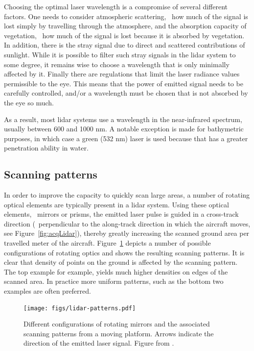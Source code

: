Choosing the optimal laser wavelength is a compromise of several different factors. 
One needs to consider atmospheric scattering, 
\ie\ how much of the signal is lost simply by travelling through the atmosphere, and the absorption capacity of vegetation, \ie\ how much of  the signal is lost because it is absorbed by vegetation. In addition, there is the stray signal due to direct and scattered contributions of sunlight. While it is possible to filter such stray signals in the lidar system to some degree, it remains wise to choose a wavelength that is only minimally affected by it. Finally there are regulations that limit the laser radiance values permissible to the eye. This means that the power of emitted signal needs to be carefully controlled, and/or a wavelength must be chosen that  is not absorbed by the eye so much.

As a result, most lidar systems use a wavelength in the near-infrared spectrum, usually between 600 and 1000 nm. A notable exception is made for bathymetric purposes, in which case a green (532 nm) laser is used because that has a greater penetration ability in water.

\subsection{Scanning patterns}
In order to improve the capacity to quickly scan large areas, a number of rotating optical elements are typically present in a lidar system. Using these optical elements, \ie\  mirrors or prisms, the emitted laser pulse is guided in a cross-track direction (\ie\ perpendicular to the along-track direction in which  the aircraft moves, see Figure~\ref{fig:acqLidar}),  thereby greatly increasing the scanned ground area  per travelled meter of the aircraft.
Figure~\ref{fig:lidar-patterns} depicts a number of possible configurations of rotating optics and shows the resulting scanning patterns. It is clear that density of points on the ground is affected by the scanning pattern. The top example for example, yields much higher densities on edges of the scanned area. In practice more uniform patterns, such  as the bottom two examples are often preferred.

\begin{figure}
	\centering
	\texttt{[image: figs/lidar-patterns.pdf]}
	\caption{Different configurations of rotating mirrors and the associated scanning patterns from a moving platform. Arrows indicate the direction of the emitted laser signal. Figure from \citet{Chazette16}.}%
\label{fig:lidar-patterns}
\end{figure}


